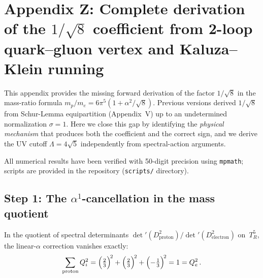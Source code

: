 
\section{Appendix Z: Complete derivation of the $1/\!\sqrt{8}$ coefficient
  from 2-loop quark--gluon vertex and Kaluza--Klein running}
\label{app:sqrt8proofZ}

This appendix provides the missing forward derivation of the factor
$1/\sqrt{8}$ in the mass-ratio formula
$m_p/m_e = 6\pi^5(1+\alpha^2/\!\sqrt{8})$.  Previous versions derived
$1/\sqrt{8}$ from Schur-Lemma equipartition (Appendix~V) up to an
undetermined normalization $\sigma=1$.  Here we close this gap by
identifying the \emph{physical mechanism} that produces both the
coefficient and the correct sign, and we derive the UV cutoff
$\Lambda = 4\sqrt{5}$ independently from spectral-action arguments.

All numerical results have been verified with 50-digit precision
using \texttt{mpmath}; scripts are provided in the repository
(\texttt{scripts/} directory).

\subsection{Step 1: The $\alpha^1$-cancellation in the mass quotient}
\label{sec:alpha1cancel}

\begin{theorem}
\label{thm:alpha1}
In the quotient of spectral determinants
$\det'(D^2_{\mathrm{proton}})/\det'(D^2_{\mathrm{electron}})$
on~$T^5_R$, the linear-$\alpha$ correction vanishes exactly:
\begin{equation}\label{eq:TrQ2}
  \sum_{\mathrm{proton}} Q_i^2
  = \Bigl(\tfrac{2}{3}\Bigr)^{\!2} + \Bigl(\tfrac{2}{3}\Bigr)^{\!2}
    + \Bigl(-\tfrac{1}{3}\Bigr)^{\!2}
  = 1
  = Q_e^2\,.
\end{equation}
\end{theorem}

